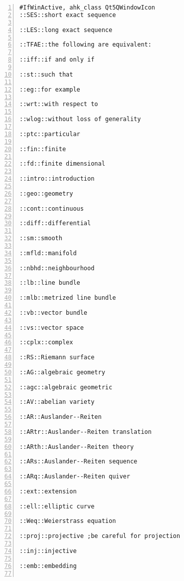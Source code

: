 \documentclass[11pt]{amsart}
\begin{document}
\begin{lstlisting}[numbers=left,numberstyle=\tiny,numbersep=10pt]
#IfWinActive, ahk_class Qt5QWindowIcon
::SES::short exact sequence

::LES::long exact sequence

::TFAE::the following are equivalent:

::iff::if and only if

::st::such that 

::eg::for example

::wrt::with respect to

::wlog::without loss of generality

::ptc::particular

::fin::finite

::fd::finite dimensional

::intro::introduction

::geo::geometry

::cont::continuous

::diff::differential

::sm::smooth

::mfld::manifold

::nbhd::neighbourhood

::lb::line bundle

::mlb::metrized line bundle

::vb::vector bundle

::vs::vector space

::cplx::complex

::RS::Riemann surface

::AG::algebraic geometry

::agc::algebraic geometric

::AV::abelian variety

::AR::Auslander--Reiten

::ARtr::Auslander--Reiten translation

::ARth::Auslander--Reiten theory

::ARs::Auslander--Reiten sequence

::ARq::Auslander--Reiten quiver

::ext::extension

::ell::elliptic curve

::Weq::Weierstrass equation

::proj::projective ;be careful for projection

::inj::injective

::emb::embedding


\end{lstlisting}
\end{document}
